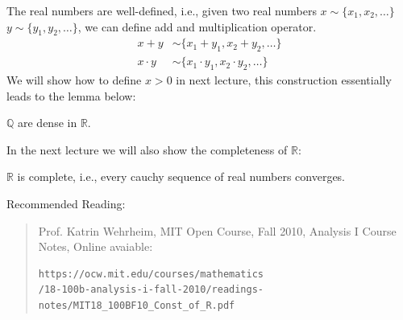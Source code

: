 The real numbers are well-defined, i.e., given two real numbers $x\sim\{x_1,x_2,\dots\}$ $y\sim\{y_1,y_2,\dots\}$, we can define add and multiplication operator.
\begin{align*}
x+y&\sim\{x_1+y_1,x_2+y_2,\dots\}\\
x\cdot y&\sim\{x_1\cdot y_1,x_2\cdot y_2,\dots\}
\end{align*}
We will show how to define $x>0$ in next lecture, this construction essentially leads to the lemma below:
\begin{proposition}
$\mathbb{Q}$ are dense in $\mathbb{R}$.
\end{proposition}
In the next lecture we will also show the completeness of $\mathbb{R}$:
\begin{theorem}
$\mathbb{R}$ is complete, i.e., every cauchy sequence of real numbers converges.
\end{theorem}
Recommended Reading:
\begin{quotation}
Prof. Katrin Wehrheim, MIT Open Course, Fall 2010,
Analysis I Course Notes, Online avaiable: 
\begin{verbatim}
https://ocw.mit.edu/courses/mathematics
/18-100b-analysis-i-fall-2010/readings-notes/MIT18_100BF10_Const_of_R.pdf
\end{verbatim}
\end{quotation}
















